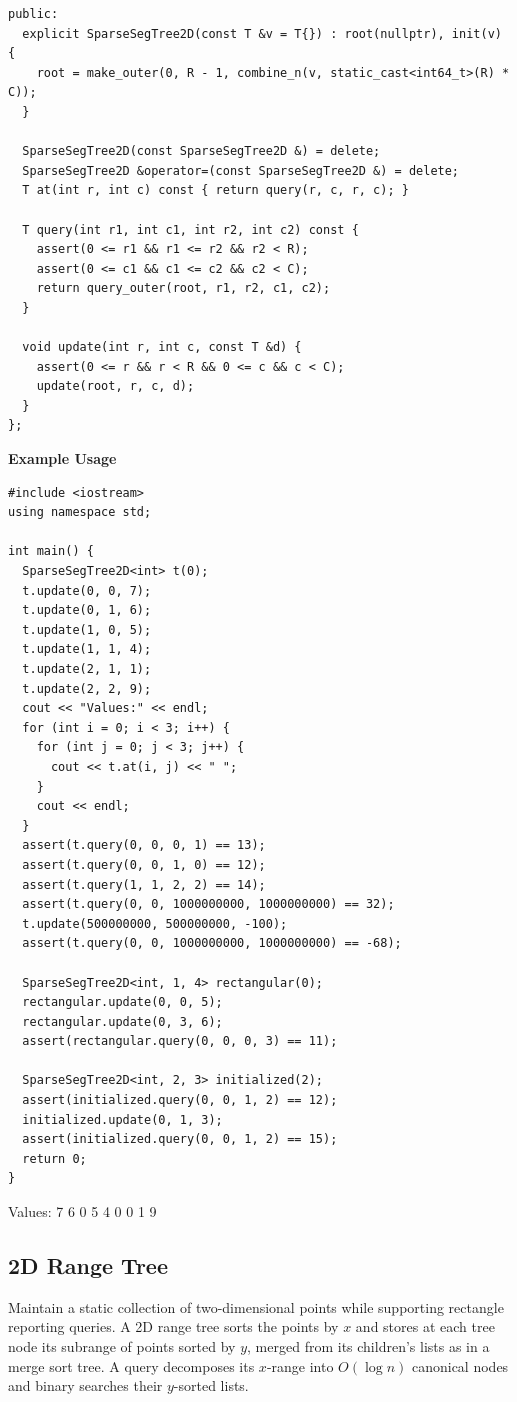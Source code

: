 \begin{lstlisting}[style=cpp]
 public:
  explicit SparseSegTree2D(const T &v = T{}) : root(nullptr), init(v) {
    root = make_outer(0, R - 1, combine_n(v, static_cast<int64_t>(R) * C));
  }

  SparseSegTree2D(const SparseSegTree2D &) = delete;
  SparseSegTree2D &operator=(const SparseSegTree2D &) = delete;
  T at(int r, int c) const { return query(r, c, r, c); }

  T query(int r1, int c1, int r2, int c2) const {
    assert(0 <= r1 && r1 <= r2 && r2 < R);
    assert(0 <= c1 && c1 <= c2 && c2 < C);
    return query_outer(root, r1, r2, c1, c2);
  }

  void update(int r, int c, const T &d) {
    assert(0 <= r && r < R && 0 <= c && c < C);
    update(root, r, c, d);
  }
};
\end{lstlisting}
\textbf{Example Usage}\par
\begin{lstlisting}[style=cpp]
#include <iostream>
using namespace std;

int main() {
  SparseSegTree2D<int> t(0);
  t.update(0, 0, 7);
  t.update(0, 1, 6);
  t.update(1, 0, 5);
  t.update(1, 1, 4);
  t.update(2, 1, 1);
  t.update(2, 2, 9);
  cout << "Values:" << endl;
  for (int i = 0; i < 3; i++) {
    for (int j = 0; j < 3; j++) {
      cout << t.at(i, j) << " ";
    }
    cout << endl;
  }
  assert(t.query(0, 0, 0, 1) == 13);
  assert(t.query(0, 0, 1, 0) == 12);
  assert(t.query(1, 1, 2, 2) == 14);
  assert(t.query(0, 0, 1000000000, 1000000000) == 32);
  t.update(500000000, 500000000, -100);
  assert(t.query(0, 0, 1000000000, 1000000000) == -68);

  SparseSegTree2D<int, 1, 4> rectangular(0);
  rectangular.update(0, 0, 5);
  rectangular.update(0, 3, 6);
  assert(rectangular.query(0, 0, 0, 3) == 11);

  SparseSegTree2D<int, 2, 3> initialized(2);
  assert(initialized.query(0, 0, 1, 2) == 12);
  initialized.update(0, 1, 3);
  assert(initialized.query(0, 0, 1, 2) == 15);
  return 0;
}
\end{lstlisting}
\begin{exampleoutput}
Values:
7 6 0
5 4 0
0 1 9
\end{exampleoutput}
\subsection{2D Range Tree}
\label{sec:2.6.3}
Maintain a static collection of two-dimensional points while supporting rectangle reporting queries. A 2D range tree sorts the points by $x$ and stores at each tree node its subrange of points sorted by $y$, merged from its children's lists as in a merge sort tree. A query decomposes its $x$-range into $O(\log n)$ canonical nodes and binary searches their $y$-sorted lists.

